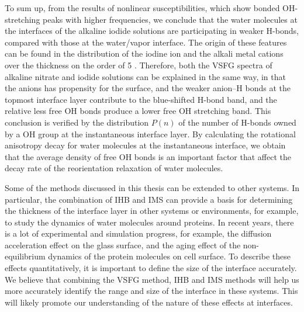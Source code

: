 To sum up, from the results of nonlinear susceptibilities, which show bonded OH-stretching peaks with higher frequencies, 
we conclude that the water molecules at the interfaces of the alkaline iodide solutions are participating 
in weaker H-bonds, compared with those at the water/vapor interface. 
The origin of these features can be found in the distribution of the iodine ion and the alkali metal cations
over the thickness on the order of 5 \A. 
Therefore, both the VSFG spectra of alkaline nitrate and iodide solutions can be explained in the same way, 
in that the anions has propensity for the surface, and the weaker anion--H bonds at the topmost interface layer contribute to the blue-shifted H-bond band,
and the relative less free OH bonds produce a lower free OH stretching band.
This conclusion is verified by the distribution $P(n)$ of the number of H-bonds owned by a OH group at the instantaneous interface layer. 
By calculating the rotational anisotropy decay for water molecules at the instantaneous interface, 
we obtain that the average density of free OH bonds is an important factor that affect the decay rate of the reorientation relaxation of water molecules.


Some of the methods discussed in this thesis can be extended to other systems.
In particular, the combination of IHB and IMS can provide a basis for determining the thickness of the interface layer in other systems or environments, 
for example, to study the dynamics of water molecules around proteins. 
In recent years, there is a lot of experimental and simulation progress, for example, the diffusion acceleration effect on the glass surface\cite{ZhuL11,ZhangWei16}, 
and the aging effect of the non-equilibrium dynamics of the protein molecules on cell surface\cite{HuXiaohu16}. 
To describe these effects quantitatively, it is important to define the size of the interface accurately. 
We believe that combining the VSFG method, IHB and IMS methods will help us more accurately identify the range and size of the interface in these systems.
This will likely promote our understanding of the nature of these effects at interfaces.

